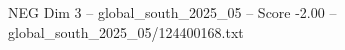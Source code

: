 \begin{textsample}{NEG Dim 3 – global\_south\_2025\_05 – Score -2.00 – global\_south\_2025\_05/124400168.txt}
\end{textsample}

